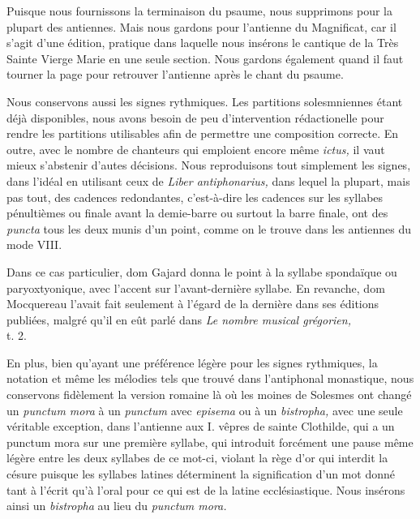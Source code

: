 \begin{frpars}
Puisque nous fournissons la terminaison du psaume, nous supprimons  pour la plupart des antiennes. Mais nous gardons  pour l'antienne du Magnificat, car il s'agit d'une édition, pratique dans laquelle nous insérons le cantique de la Très Sainte Vierge Marie en une seule section. Nous gardons également  quand il faut tourner la page pour retrouver l'antienne après le chant du psaume.


Nous conservons aussi les signes rythmiques. Les partitions solesmniennes étant déjà disponibles, nous avons besoin de peu d'intervention rédactionelle pour rendre les partitions utilisables afin de permettre une composition correcte. En outre, avec le nombre de chanteurs qui emploient encore même \textit{ictus,} il vaut mieux s'abstenir d'autes décisions. Nous reproduisons tout simplement les signes, dans l'idéal en utilisant ceux de \textit{Liber antiphonarius,} dans lequel la plupart, mais pas tout, des cadences redondantes, c’est-à-dire les cadences sur les syllabes pénultièmes ou finale avant la demie-barre ou surtout la barre finale, ont des \textit{puncta} tous les deux munis d'un point, comme on le trouve dans les antiennes du mode VIII.

Dans ce cas particulier, dom Gajard donna le point à la syllabe spondaïque ou paryoxtyonique, avec l'accent sur l'avant-dernière syllabe. En revanche, dom Mocquereau l'avait fait seulement à l'égard de la dernière dans ses éditions publiées, malgré qu'il en eût parlé dans \textit{Le nombre musical grégorien,} \\ t. 2.

En plus, bien qu'ayant une préférence légère pour les signes rythmiques, la notation et même les mélodies tels que trouvé dans l'antiphonal monastique, nous conservons fidèlement la version romaine là où les moines de Solesmes ont changé un \textit{punctum mora} à un \textit{punctum} avec \textit{episema} ou à un \textit{bistropha,} avec une seule véritable exception, dans l'antienne aux I. vêpres de sainte Clothilde, qui a un punctum mora sur une première syllabe, qui introduit forcément une pause même légère entre les deux syllabes de ce mot-ci, violant la rège d'or qui interdit la césure puisque les syllabes latines déterminent la signification d'un mot donné tant à l'écrit qu'à l'oral pour ce qui est de la latine ecclésiastique. Nous insérons ainsi un \textit{bistropha} au lieu du \textit{punctum mora.}


\end{frpars}
